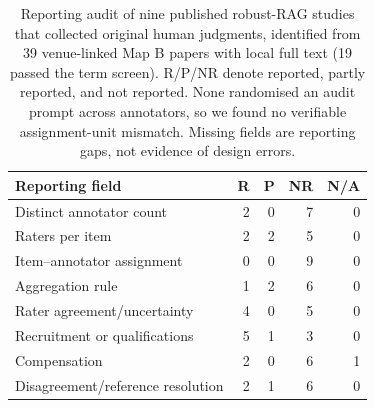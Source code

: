 \begin{table}[t]
\centering\footnotesize
\setlength{\tabcolsep}{4pt}
\begin{tabular}{lrrrr}
\toprule
Reporting field & R & P & NR & N/A \\
\midrule
Distinct annotator count & 2 & 0 & 7 & 0 \\
Raters per item & 2 & 2 & 5 & 0 \\
Item--annotator assignment & 0 & 0 & 9 & 0 \\
Aggregation rule & 1 & 2 & 6 & 0 \\
Rater agreement/uncertainty & 4 & 0 & 5 & 0 \\
Recruitment or qualifications & 5 & 1 & 3 & 0 \\
Compensation & 2 & 0 & 6 & 1 \\
Disagreement/reference resolution & 2 & 1 & 6 & 0 \\
\bottomrule
\end{tabular}
\caption{Reporting audit of nine published robust-RAG studies that collected original human judgments, identified from 39 venue-linked Map B papers with local full text (19 passed the term screen). R/P/NR denote reported, partly reported, and not reported. None randomised an audit prompt across annotators, so we found no verifiable assignment-unit mismatch. Missing fields are reporting gaps, not evidence of design errors.}
\label{tab:published-human-evaluation-audit}
\end{table}
